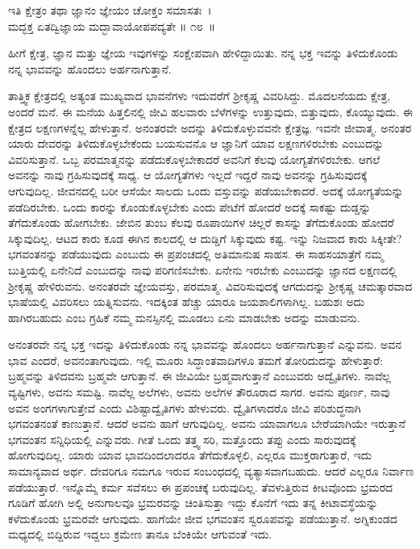 \begin{shloka}
ಇತಿ ಕ್ಷೇತ್ರಂ ತಥಾ ಜ್ಞಾನಂ ಜ್ಞೇಯಂ ಚೋಕ್ತಂ ಸಮಾಸತಃ~।\\ಮದ್ಭಕ್ತ ಏತದ್ವಿಜ್ಞಾಯ ಮದ್ಭಾವಾಯೋಪಪದ್ಯತೇ \hfill॥ ೧೮~॥
\end{shloka}

\begin{artha}
ಹೀಗೆ ಕ್ಷೇತ್ರ, ಜ್ಞಾನ ಮತ್ತು ಜ್ಞೇಯ ಇವುಗಳನ್ನು ಸಂಕ್ಷೇಪವಾಗಿ ಹೇಳಿದ್ದಾಯಿತು. ನನ್ನ ಭಕ್ತ ಇವನ್ನು ತಿಳಿದುಕೊಂಡು ನನ್ನ ಭಾವವನ್ನು ಹೊಂದಲು ಅರ್ಹನಾಗುತ್ತಾನೆ.
\end{artha}

ತಾತ್ತ್ವಿಕ ಕ್ಷೇತ್ರದಲ್ಲಿ ಅತ್ಯಂತ ಮುಖ್ಯವಾದ ಭಾವನೆಗಳು ಇದುವರೆಗೆ ಶ‍್ರೀಕೃಷ್ಣ ವಿವರಿಸಿದ್ದು. ಮೊದಲನೆಯದು ಕ್ಷೇತ್ರ, ಅಂದರೆ ಮನೆ. ಈ ಮನೆಯ ಹಿತ್ತಲಿನಲ್ಲಿ ಜೀವಿ ಹಲವಾರು ಬೆಳೆಗಳನ್ನು ಉತ್ತುವುದು, ಬಿತ್ತುವುದು, ಕೊಯ್ಯುವುದು. ಈ ಕ್ಷೇತ್ರದ ಲಕ್ಷಣಗಳನ್ನೆಲ್ಲ ಹೇಳುತ್ತಾನೆ. ಅನಂತರವೇ ಅದನ್ನು ತಿಳಿದುಕೊಳ್ಳುವವನೇ ಕ್ಷೇತ್ರಜ್ಞ. ಇವನೇ ಜೀವಾತ್ಮ. ಅನಂತರ ಯಾರು ದೇವರನ್ನು ತಿಳಿದುಕೊಳ್ಳಬೇಕೆಂದು ಬಯಸುವನೊ ಆ ಜ್ಞಾನಿಗೆ ಯಾವ ಲಕ್ಷಣಗಳಿರಬೇಕು ಎಂಬುದನ್ನು ವಿವರಿಸುತ್ತಾನೆ. ಒಬ್ಬ ಪರಮಾತ್ಮನನ್ನು ಪಡೆದುಕೊಳ್ಳಬೇಕಾದರೆ ಅವನಿಗೆ ಕೆಲವು ಯೋಗ್ಯತೆಗಳಿರಬೇಕು. ಆಗಲೆ ಅವನನ್ನು ನಾವು ಗ್ರಹಿಸುವುದಕ್ಕೆ ಸಾಧ್ಯ. ಆ ಯೋಗ್ಯತೆಗಳು ಇಲ್ಲದೆ ಇದ್ದರೆ ನಾವು ಅವನನ್ನು ಗ್ರಹಿಸುವುದಕ್ಕೆ ಆಗುವುದಿಲ್ಲ. ಜೀವನದಲ್ಲಿ ಬರೀ ಆಸೆಯೇ ಸಾಲದು ಒಂದು ವಸ್ತುವನ್ನು ಪಡೆಯಬೇಕಾದರೆ. ಅದಕ್ಕೆ ಯೋಗ್ಯತೆಯನ್ನು ಪಡೆದಿರಬೇಕು. ಒಂದು ಕಾರನ್ನು ಕೊಂಡುಕೊಳ್ಳಬೇಕು ಎಂದು ಪೇಟೆಗೆ ಹೋದರೆ ಅದಕ್ಕೆ ಸಾಕಷ್ಟು ದುಡ್ಡನ್ನು ತೆಗೆದುಕೊಂಡು ಹೋಗಬೇಕು. ಜೇಬಿನ ತುಂಬ ಕೆಲವು ರೂಪಾಯಿಗಳ ಚಿಲ್ಲರೆ ಕಾಸನ್ನು ತೆಗೆದುಕೊಂಡು ಹೋದರೆ ಸಿಕ್ಕುವುದಿಲ್ಲ. ಆಟದ ಕಾರು ಕೂಡ ಈಗಿನ ಕಾಲದಲ್ಲಿ ಆ ದುಡ್ಡಿಗೆ ಸಿಕ್ಕುವುದು ಕಷ್ಟ. ಇನ್ನು ನಿಜವಾದ ಕಾರು ಸಿಕ್ಕೀತೇ? ಭಗವಂತನನ್ನು ಪಡೆಯುವುದು ಎಂಬುದು ಈ ಪ್ರಪಂಚದಲ್ಲಿ ಅತಿಮಾನುಷ ಸಾಹಸ. ಈ ಸಾಹಸಯಾತ್ರೆಗೆ ನಮ್ಮ ಬುತ್ತಿಯಲ್ಲಿ ಏನೇನಿದೆ ಎಂಬುದನ್ನು ನಾವು ಪರಿಗಣಿಸಬೇಕು. ಏನೇನು ಇರಬೇಕು ಎಂಬುದನ್ನು ಜ್ಞಾನದ ಲಕ್ಷಣದಲ್ಲಿ ಶ‍್ರೀಕೃಷ್ಣ ಹೇಳಿರುವನು. ಅನಂತರವೇ ಜ್ಞೇಯವಸ್ತು, ಪರಮಾತ್ಮ. ವಿವರಿಸುವುದಕ್ಕೆ ಆಗದುದನ್ನು ಶ‍್ರೀಕೃಷ್ಣ ಚಮತ್ಕಾರವಾದ ಭಾಷೆಯಲ್ಲಿ ವಿವರಿಸಲು ಯತ್ನಿಸುವನು. ಇದಕ್ಕಿಂತ ಹೆಚ್ಚು ಯಾರೂ ಜಯಶಾಲಿಗಳಾಗಿಲ್ಲ. ಬಹುಶಃ ಅದು ಹಾಗಿರಬಹುದು ಎಂಬ ಗ್ರಹಿಕೆ ನಮ್ಮ ಮನಸ್ಸಿನಲ್ಲಿ ಮೂಡಲು ಏನು ಮಾಡಬೇಕು ಅದನ್ನು ಮಾಡುವನು.

ಅನಂತರವೇ ನನ್ನ ಭಕ್ತ ಇದನ್ನು ತಿಳಿದುಕೊಂಡು ನನ್ನ ಭಾವವನ್ನು ಹೊಂದಲು ಅರ್ಹನಾಗುತ್ತಾನೆ ಎನ್ನುವನು. ಅವನ ಭಾವ ಎಂದರೆ, ಅವನಂತಾಗುವುದು. ಇಲ್ಲಿ ಮೂರು ಸಿದ್ಧಾಂತವಾದಿಗಳೂ ತಮಗೆ ತೋರಿದುದನ್ನು ಹೇಳುತ್ತಾರೆ: ಬ್ರಹ್ಮವನ್ನು ತಿಳಿದವನು ಬ್ರಹ್ಮವೇ ಆಗುತ್ತಾನೆ. ಈ ಜೀವಿಯೇ ಬ್ರಹ್ಮವಾಗುತ್ತಾನೆ ಎಂಬುವರು ಅದ್ವೈತಿಗಳು. ನಾವೆಲ್ಲ ವ್ಯಷ್ಟಿಗಳು, ಅವನು ಸಮಷ್ಟಿ. ನಾವೆಲ್ಲ ಅಲೆಗಳು, ಅವನು ಅಲೆಗಳ ತೌರೂರಾದ ಸಾಗರ. ಅವನು ಪೂರ್ಣ, ನಾವು ಅವನ ಅಂಗಗಳಾಗುತ್ತೇವೆ ಎಂದು ವಿಶಿಷ್ಟಾದ್ವೈತಿಗಳು ಹೇಳುವರು. ದ್ವೈತಿಗಳಾದರೊ ಜೀವಿ ಪರಿಶುದ್ಧನಾಗಿ ಭಗವಂತನಂತೆ ಕಾಣುತ್ತಾನೆ. ಆದರೆ ಅವನು ಹಾಗೆ ಆಗುವುದಿಲ್ಲ. ಅವನು ಯಾವಾಗಲೂ ಬೇರೆಯಾಗಿಯೇ ಇರುತ್ತಾನೆ ಭಗವಂತನ ಸನ್ನಿಧಿಯಲ್ಲಿ ಎನ್ನುವರು. ಗೀತೆ ಒಂದು ತತ್ತ್ವ ಸರಿ, ಮತ್ತೊಂದು ತಪ್ಪು ಎಂದು ಸಾರುವುದಕ್ಕೆ ಹೋಗುವುದಿಲ್ಲ. ಯಾರು ಯಾವ ಭಾವದಿಂದಲಾದರೂ ತೆಗೆದುಕೊಳ್ಳಲಿ, ಎಲ್ಲರೂ ಮುಕ್ತರಾಗುತ್ತಾರೆ, ಇದು ಸಾಮಾನ್ಯವಾದ ಅರ್ಥ. ದೇವರಿಗೂ ನಮಗೂ ಇರುವ ಸಂಬಂಧದಲ್ಲಿ ವ್ಯತ್ಯಾಸವಾಗಬಹುದು. ಆದರೆ ಎಲ್ಲರೂ ನಿರ್ವಾಣ ಪಡೆಯುತ್ತಾರೆ. ಇನ್ನೊಮ್ಮೆ ಕರ್ಮ ಸವೆಸಲು ಈ ಪ್ರಪಂಚಕ್ಕೆ ಬರುವುದಿಲ್ಲ. ತೆವಳುತ್ತಿರುವ ಕೀಟವೊಂದು ಭ್ರಮರದ ಗೂಡಿಗೆ ಹೋಗಿ ಅಲ್ಲಿ ಅನುಗಾಲವೂ ಭ್ರಮರವನ್ನು ಚಿಂತಿಸುತ್ತಾ ಇದ್ದು ಕೊನೆಗೆ ಇದು ತನ್ನ ಕೀಟಾವಸ್ಥೆಯನ್ನು ಕಳೆದುಕೊಂಡು ಭ್ರಮರವೇ ಆಗುವುದು. ಹಾಗೆಯೇ ಜೀವ ಭಗವಂತನ ಸ್ವರೂಪವನ್ನು ಪಡೆಯುತ್ತಾನೆ. ಅಗ್ನಿಕುಂಡದ ಮಧ್ಯದಲ್ಲಿ ಬಿದ್ದಿರುವ ಇದ್ದಲು ಕ್ರಮೇಣ ತಾನೂ ಬೆಂಕಿಯೇ ಆಗುವಂತೆ ಇದು.

